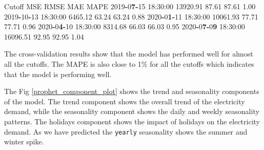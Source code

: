 \documentclass[mstat,12pt]{unswthesis}
\newenvironment{Shaded}{\begin{snugshade}}{\end{snugshade}}
\newcommand{\DecValTok}[1]{\textcolor[rgb]{0.00,0.00,0.81}{#1}}
\newcommand{\ErrorTok}[1]{\textcolor[rgb]{0.64,0.00,0.00}{\textbf{#1}}}
\newcommand{\FloatTok}[1]{\textcolor[rgb]{0.00,0.00,0.81}{#1}}
\newcommand{\NormalTok}[1]{#1}
\newcommand{\OperatorTok}[1]{\textcolor[rgb]{0.81,0.36,0.00}{\textbf{#1}}}
\begin{document}
\begin{Shaded}
\begin{Highlighting}[]
\NormalTok{Cutoff                MSE          RMSE       MAE     MAPE}
\DecValTok{2019}\OperatorTok{{-}}\DecValTok{0}\ErrorTok{7}\OperatorTok{{-}}\DecValTok{15} \DecValTok{18}\NormalTok{:}\DecValTok{30}\NormalTok{:}\DecValTok{00}   \FloatTok{13920.91}    \FloatTok{87.61}       \FloatTok{87.61}   \FloatTok{1.00}
\DecValTok{2019}\OperatorTok{{-}}\DecValTok{10}\OperatorTok{{-}}\DecValTok{13} \DecValTok{18}\NormalTok{:}\DecValTok{30}\NormalTok{:}\DecValTok{00}   \FloatTok{6465.12}     \FloatTok{63.24}       \FloatTok{63.24}   \FloatTok{0.88}
\DecValTok{2020}\OperatorTok{{-}}\DecValTok{0}\ErrorTok{1}\OperatorTok{{-}}\DecValTok{11} \DecValTok{18}\NormalTok{:}\DecValTok{30}\NormalTok{:}\DecValTok{00}   \FloatTok{10061.93}    \FloatTok{77.71}       \FloatTok{77.71}   \FloatTok{0.96}
\DecValTok{2020}\OperatorTok{{-}}\DecValTok{0}\ErrorTok{4}\OperatorTok{{-}}\DecValTok{10} \DecValTok{18}\NormalTok{:}\DecValTok{30}\NormalTok{:}\DecValTok{00}   \FloatTok{8314.68}     \FloatTok{66.03}       \FloatTok{66.03}   \FloatTok{0.95}
\DecValTok{2020}\OperatorTok{{-}}\DecValTok{0}\ErrorTok{7}\OperatorTok{{-}}\DecValTok{0}\ErrorTok{9} \DecValTok{18}\NormalTok{:}\DecValTok{30}\NormalTok{:}\DecValTok{00}   \FloatTok{16096.51}    \FloatTok{92.95}       \FloatTok{92.95}   \FloatTok{1.04}
\end{Highlighting}
\end{Shaded}

The cross-validation results show that the model has performed well for
almost all the cutoffs. The MAPE is also close to 1\% for all the
cutoffs which indicates that the model is performing well.

The Fig \ref{prophet_component_plot} shows the trend and seasonality
components of the model. The trend component shows the overall trend of
the electricity demand, while the seasonality component shows the daily
and weekly seasonality patterns. The holidays component shows the impact
of holidays on the electricity demand. As we have predicted the
\texttt{yearly} seasonality shows the summer and winter spike.
\end{document}
